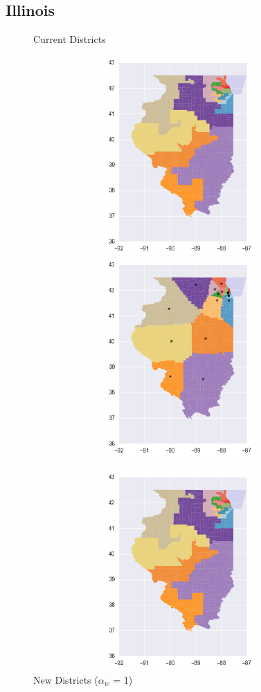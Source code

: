 \clearpage
\newpage

\subsection{Illinois}
\begin{figure}[htb!] \centering
\caption{ Current Districts }
\includegraphics[width=5in,height=3in,keepaspectratio]{../maps/IL/static/before.png}
\includegraphics[width=5in,height=3in,keepaspectratio]{../maps/IL/static/0_0_after.png}
\caption{ New Districts ($\alpha_w$ = 1) }
\includegraphics[width=5in,height=3in,keepaspectratio]{../maps/IL/static/before.png}

\end{figure}
